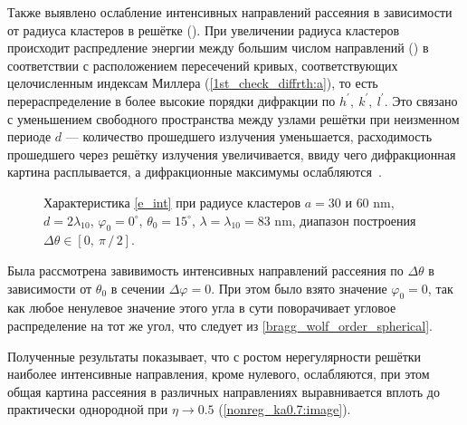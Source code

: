 
Также выявлено ослабление интенсивных направлений рассеяния в зависимости от радиуса кластеров в решётке (). При увеличении радиуса кластеров происходит распредление энергии между большим числом направлений () в соответствии с расположением пересечений кривых, соответствующих целочисленным индексам Миллера (\autoref{1st_check_diffrth:a}), то есть перераспределение в более высокие порядки дифракции по $h^\prime,\:k^\prime,\:l^\prime$. Это связано с уменьшением свободного пространства между узлами решётки при неизменном периоде $d$ --- количество прошедшего излучения уменьшается, расходимость прошедшего через решётку излучения увеличивается, ввиду чего дифракционная картина расплывается, а дифракционные максимумы ослабляются~\cite{born_wolf}.

    \begin{figure}[H]
        \hfil
        \caption{Характеристика \autoref{e_int} при радиусе кластеров $a = 30$ и $60$ nm, $d = 2\lambda_{10}$, $\varphi_0 = 0^{\circ}$, $\theta_0 = 15^{\circ}$, $\lambda = \lambda_{10} = 83$ nm, диапазон построения $\Delta \theta \in \left[ 0,\:\pi\,/\,2 \right]$.}\label{radius_wawa:image}
    \end{figure}


Была рассмотрена завивимость интенсивных направлений рассеяния по $\Delta \theta$ в зависимости от $\theta_0$ в сечении $\Delta \varphi = 0$. При этом было взято значение $\varphi_0 = 0$, так как любое ненулевое значение этого угла в сути поворачивает угловое распределение на тот же угол, что следует из \autoref{bragg_wolf_order_spherical}.



Полученные результаты показывает, что с ростом нерегулярности решётки наиболее интенсивные направления, кроме нулевого, ослабляются, при этом общая картина рассеяния в различных направлениях выравнивается вплоть до практически однородной при $\eta \to 0.5$ (\autoref{nonreg_ka0.7:image}).